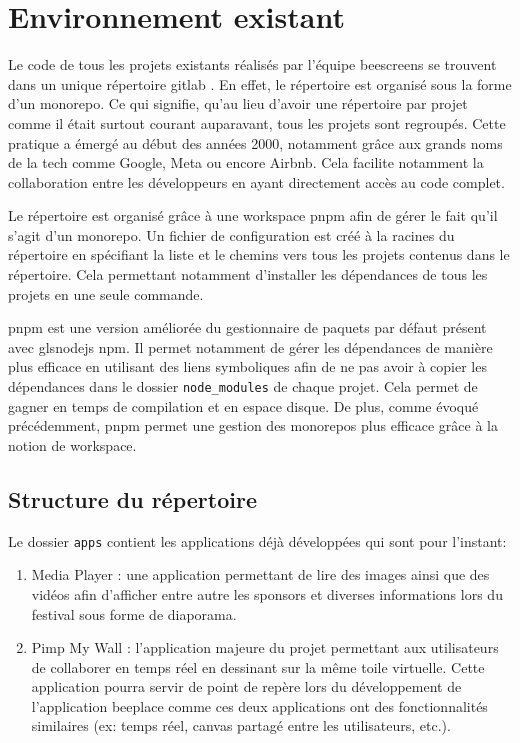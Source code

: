 \section{Environnement existant}

Le code de tous les projets existants réalisés par l'équipe \gls{beescreens} se trouvent dans un unique répertoire \gls{gitlab} \cite{beescreens}. En effet, le répertoire est organisé sous la forme d'un monorepo. Ce qui signifie, qu'au lieu d'avoir une répertoire par projet comme il était surtout courant auparavant, tous les projets sont regroupés. Cette pratique a émergé au début des années 2000, notamment grâce aux grands noms de la tech comme Google, Meta ou encore Airbnb. Cela facilite notamment la collaboration entre les développeurs en ayant directement accès au code complet.

Le répertoire est organisé grâce à une workspace \gls{pnpm} \cite{pnpmworkspace} afin de gérer le fait qu'il s'agit d'un monorepo. Un fichier de configuration est créé à la racines du répertoire en spécifiant la liste et le chemins vers tous les projets contenus dans le répertoire. Cela permettant notamment d'installer les dépendances de tous les projets en une seule commande.

\gls{pnpm} est une version améliorée du gestionnaire de paquets par défaut présent avec gls{nodejs} \cite{nodejs} \gls{npm}. Il permet notamment de gérer les dépendances de manière plus efficace en utilisant des liens symboliques afin de ne pas avoir à copier les dépendances dans le dossier \texttt{node_modules} de chaque projet. Cela permet de gagner en temps de compilation et en espace disque. De plus, comme évoqué précédemment, \gls{pnpm} permet une gestion des monorepos plus efficace grâce à la notion de workspace.

\subsection{Structure du répertoire}


Le dossier \texttt{apps} contient les applications déjà développées qui sont pour l'instant:

\begin{enumerate}
  \item Media Player : une application permettant de lire des images ainsi que des vidéos afin d'afficher entre autre les sponsors et diverses informations lors du festival sous forme de diaporama.
  \item Pimp My Wall : l'application majeure du projet permettant aux utilisateurs de collaborer en temps réel en dessinant sur la même toile virtuelle. Cette application pourra servir de point de repère lors du développement de l'application \gls{beeplace} comme ces deux applications ont des fonctionnalités similaires (ex: temps réel, canvas partagé entre les utilisateurs, etc.).
\end{enumerate}

